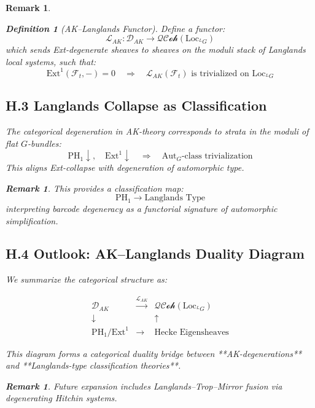 \documentclass[11pt]{article}
\newtheorem{definition}[theorem]{Definition}
\newtheorem{remark}[theorem]{Remark}
\begin{document}
\begin{remark}
\begin{definition}[AK–Langlands Functor]
Define a functor:
\[
\mathcal{L}_{AK} : \mathcal{D}_{AK} \longrightarrow \mathcal{QCoh}(\mathrm{Loc}_{^LG})
\]
which sends Ext-degenerate sheaves to sheaves on the moduli stack of Langlands local systems, such that:
\[
\mathrm{Ext}^1(\mathcal{F}_t, -) = 0 \quad \Rightarrow \quad \mathcal{L}_{AK}(\mathcal{F}_t) \text{ is trivialized on } \mathrm{Loc}_{^LG}
\]
\end{definition}

\subsection*{H.3 Langlands Collapse as Classification}

\begin{proposition}
The categorical degeneration in AK-theory corresponds to strata in the moduli of flat \( G \)-bundles:
\[
\text{PH}_1 \downarrow,\quad \mathrm{Ext}^1 \downarrow \quad \Rightarrow \quad \mathrm{Aut}_G\text{-class trivialization}
\]
This aligns Ext-collapse with degeneration of automorphic type.
\end{proposition}

\begin{remark}
This provides a classification map:
\[
\mathrm{PH}_1 \to \text{Langlands Type}
\]
interpreting barcode degeneracy as a functorial signature of automorphic simplification.
\end{remark}

\subsection*{H.4 Outlook: AK–Langlands Duality Diagram}

We summarize the categorical structure as:

\[
\begin{array}{ccc}
\mathcal{D}_{AK} & \xrightarrow{\mathcal{L}_{AK}} & \mathcal{QCoh}(\mathrm{Loc}_{^LG}) \\
\downarrow & & \uparrow \\
\mathrm{PH}_1 / \mathrm{Ext}^1 & \longrightarrow & \text{Hecke Eigensheaves}
\end{array}
\]

This diagram forms a categorical duality bridge  
between **AK-degenerations** and **Langlands-type classification theories**.

\begin{remark}
Future expansion includes Langlands–Trop–Mirror fusion via degenerating Hitchin systems.
\end{remark}


\end{remark}
\end{document}
